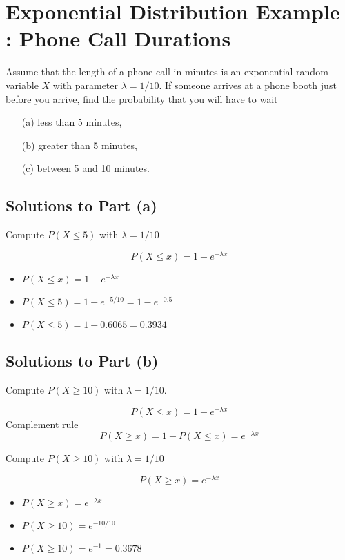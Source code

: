 \documentclass[a4paper,12pt]{article}
\begin{document}
\section*{Exponential Distribution Example : Phone Call Durations}


Assume that the length of a phone call in minutes is an exponential random variable $X$ with parameter
$\lambda = 1/10$. If someone arrives at a phone booth just before you arrive, find the probability that you
will have to wait \begin{itemize}
\item[(a)] less than 5 minutes,
\item[(b)] greater than 5 minutes,
\item[(c)] between 5 and 10 minutes.
\end{itemize}

\subsection*{Solutions to Part (a)}

Compute $P(X \leq 5)$ with $\lambda = 1/10$

\[ P(X \leq x) = 1-e^{-\lambda x} \]

\begin{itemize}
	\item $ P(X \leq x) = 1-e^{-\lambda x} $
	\item $ P(X \leq 5) = 1-e^{-5/10}  = 1-e^{-0.5}$
	\item $ P(X \leq 5) = 1-0.6065  = 0.3934 $
\end{itemize} 

\subsection*{Solutions to Part (b)}
Compute $P(X \geq 10)$ with $\lambda = 1/10$.

\[ P(X \leq x) = 1-e^{-\lambda x} \]
Complement rule
\[ P(X \geq x) = 1- P(X \leq x) =  e^{-\lambda x} \]

\medskip
\noindent Compute $P(X \geq 10)$ with $\lambda = 1/10$

\[ P(X \geq x) = e^{-\lambda x} \]


\begin{itemize}
	\item $ P(X \geq x) = e^{-\lambda x} $
	\item $ P(X \geq 10) = e^{-10/10}  $
	\item $ P(X \geq 10) = e^{-1} =  0.3678 $

\end{itemize} 
\end{document}
